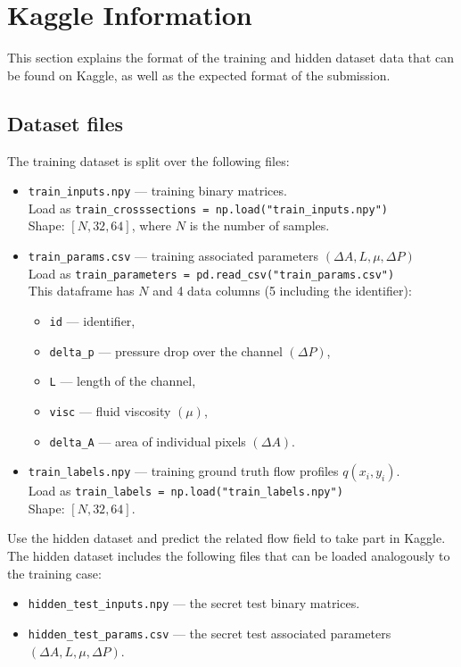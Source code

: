 \documentclass[11pt,a4paper]{article}
\begin{document}
\section{Kaggle Information}

This section explains the format of the training and hidden dataset data that can be found on Kaggle, as well as the expected format of the submission.

\subsection{Dataset files}

The training dataset is split over the following files:
\begin{itemize}
    \item \texttt{train\_inputs.npy} --- training binary matrices.\\
    Load as \texttt{train\_crosssections = np.load("train\_inputs.npy")}\\
    Shape: \([N,32,64]\), where \(N\) is the number of samples.

    \item \texttt{train\_params.csv} --- training associated parameters \((\Delta A,L,\mu,\Delta P)\)\\
    Load as \texttt{train\_parameters = pd.read\_csv("train\_params.csv")}\\
    This dataframe has \(N\) and 4 data columns (5 including the identifier):
    \begin{itemize}
        \item \texttt{id} --- identifier,
        \item \texttt{delta\_p} --- pressure drop over the channel \((\Delta P)\),
        \item \texttt{L} --- length of the channel,
        \item \texttt{visc} --- fluid viscosity \((\mu)\),
        \item \texttt{delta\_A} --- area of individual pixels \((\Delta A)\).
    \end{itemize}

    \item \texttt{train\_labels.npy} --- training ground truth flow profiles \(q(x_i,y_i)\).\\
    Load as \texttt{train\_labels = np.load("train\_labels.npy")}\\
    Shape: \([N,32,64]\).
\end{itemize}

Use the hidden dataset and predict the related flow field to take part in Kaggle. The hidden dataset includes the following files that can be loaded analogously to the training case:
\begin{itemize}
    \item \texttt{hidden\_test\_inputs.npy} --- the secret test binary matrices.
    \item \texttt{hidden\_test\_params.csv} --- the secret test associated parameters \((\Delta A,L,\mu,\Delta P)\).
\end{itemize}
\end{document}
